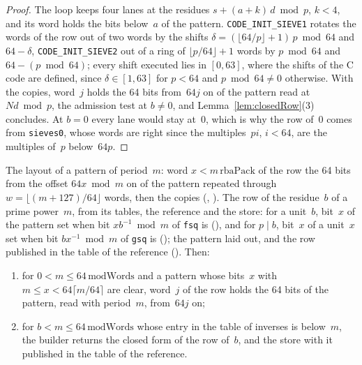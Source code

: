 \begin{proof}
  \leanok
  The loop keeps four lanes at the residues $s + (a + k)\, d \bmod p$, $k < 4$, and its word holds
  the bits below~$a$ of the pattern. \verb|CODE_INIT_SIEVE1| rotates the words of the row out of
  two words by the shifts $\delta = (\lfloor 64/p \rfloor + 1)\, p \bmod 64$ and $64 - \delta$,
  \verb|CODE_INIT_SIEVE2| out of a ring of $\lfloor p/64 \rfloor + 1$ words by $p \bmod 64$ and
  $64 - (p \bmod 64)$; every shift executed lies in $[0, 63]$, where the shifts of the C code are
  defined, since $\delta \in [1, 63]$ for $p < 64$ and $p \bmod 64 \ne 0$ otherwise. With the
  copies, word~$j$ holds the 64 bits from~$64 j$ on of the pattern read at $N d \bmod p$, the
  admission test at $b \ne 0$, and Lemma~\ref{lem:closedRow}(3) concludes. At $b = 0$ every lane
  would stay at~$0$, which is why the row of~$0$ comes from \verb|sieves0|, whose words are right
  since the multiples~$p i$, $i < 64$, are the multiples of~$p$ below~$64 p$.
\end{proof}

\begin{lemma}\label{lem:powerRows}
  \leanok
  The layout of a pattern of period~$m$: word $x < m\,\mathrm{rbaPack}$ of the row the 64 bits from
  the offset $64 x \bmod m$ on of the pattern repeated through $w = \lfloor (m + 127)/64 \rfloor$
  words, then the copies (, ). The row of the
  residue~$b$ of a prime power~$m$, from its tables, the reference and the store: for a unit~$b$,
  bit~$x$ of the pattern set when bit $x b^{-1} \bmod m$ of \verb|fsq| is
  (), and for $p \mid b$, bit~$x$ of a unit~$x$ set when bit
  $b x^{-1} \bmod m$ of \verb|gsq| is (); the pattern laid out, and the
  row published in the table of the reference (). Then:
  \begin{enumerate}
    \item for $0 < m \le 64\,\mathrm{modWords}$ and a pattern whose bits~$x$ with
      $m \le x < 64 \lceil m/64 \rceil$ are clear, word~$j$ of the row holds the 64 bits of the
      pattern, read with period~$m$, from~$64 j$ on;
    \item for $b < m \le 64\,\mathrm{modWords}$ whose entry in the table of inverses is below~$m$,
      the builder returns the closed form of the row of~$b$, and the store with it published in the
      table of the reference.
  \end{enumerate}
\end{lemma}


